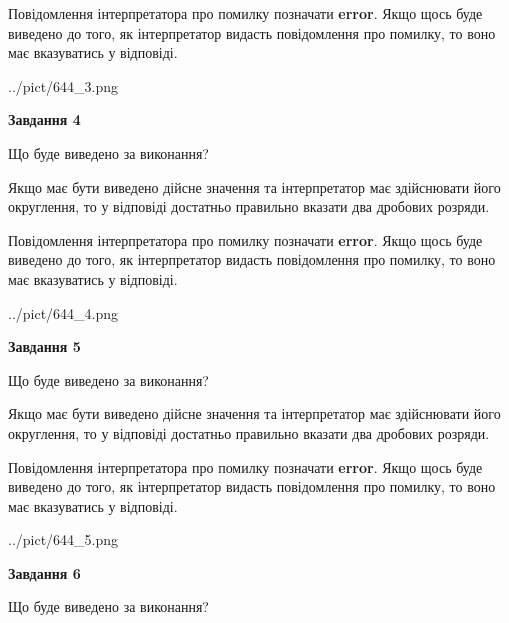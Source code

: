 \documentclass[12pt, ukrainian]{article}
\begin{document}
{\begin {Large}
Повідомлення інтерпретатора про помилку позначати \textbf{error}.
Якщо щось буде виведено до того, як інтерпретатор видасть повідомлення про помилку, 
то воно має вказуватись у відповіді. \par

\begin{center}
	{../pict/644_3.png}
\end{center}
\newpage

{\begin {center}\textbf{Завдання 4}\end {center}}\par
Що буде виведено за виконання? \par

Якщо має бути виведено дійсне значення та інтерпретатор має здійснювати його округлення, 
то у відповіді достатньо правильно вказати два дробових розряди.

Повідомлення інтерпретатора про помилку позначати \textbf{error}.
Якщо щось буде виведено до того, як інтерпретатор видасть повідомлення про помилку, 
то воно має вказуватись у відповіді. \par

\begin{center}
	{../pict/644_4.png}
\end{center}
\newpage

{\begin {center}\textbf{Завдання 5}\end {center}}\par
Що буде виведено за виконання? \par

Якщо має бути виведено дійсне значення та інтерпретатор має здійснювати його округлення, 
то у відповіді достатньо правильно вказати два дробових розряди.

Повідомлення інтерпретатора про помилку позначати \textbf{error}.
Якщо щось буде виведено до того, як інтерпретатор видасть повідомлення про помилку, 
то воно має вказуватись у відповіді. \par

\begin{center}
	{../pict/644_5.png}
\end{center}
\newpage

{\begin {center}\textbf{Завдання 6}\end {center}}\par
Що буде виведено за виконання? \par


\end{Large}}
\end{document}
